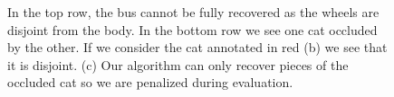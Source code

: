 \begin{figure}[!ht]







\caption{ In the top row, the bus cannot be fully recovered as the wheels are disjoint from the body. In the bottom row we see one cat occluded by the other. If we consider the cat annotated in red (b) we see that it is disjoint. (c) Our algorithm can only recover pieces of the occluded cat so we are penalized during evaluation. }
\label{fig:fail2}
 \end{figure}
